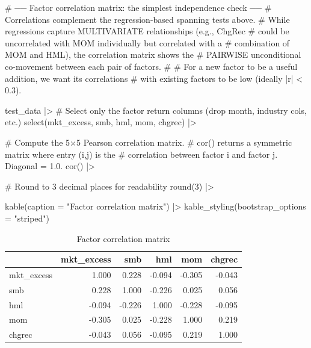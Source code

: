 \documentclass[
  letterpaper,
  DIV=11,
  numbers=noendperiod]{scrartcl}
\newenvironment{Shaded}{\begin{snugshade}}{\end{snugshade}}
\newcommand{\AttributeTok}[1]{\textcolor[rgb]{0.40,0.45,0.13}{#1}}
\newcommand{\CommentTok}[1]{\textcolor[rgb]{0.37,0.37,0.37}{#1}}
\newcommand{\DecValTok}[1]{\textcolor[rgb]{0.68,0.00,0.00}{#1}}
\newcommand{\FunctionTok}[1]{\textcolor[rgb]{0.28,0.35,0.67}{#1}}
\newcommand{\NormalTok}[1]{\textcolor[rgb]{0.00,0.23,0.31}{#1}}
\newcommand{\SpecialCharTok}[1]{\textcolor[rgb]{0.37,0.37,0.37}{#1}}
\newcommand{\StringTok}[1]{\textcolor[rgb]{0.13,0.47,0.30}{#1}}
\begin{document}
\begin{Shaded}
\begin{Highlighting}[]
\CommentTok{\# ── Factor correlation matrix: the simplest independence check ──}
\CommentTok{\# Correlations complement the regression{-}based spanning tests above.}
\CommentTok{\# While regressions capture MULTIVARIATE relationships (e.g., ChgRec}
\CommentTok{\# could be uncorrelated with MOM individually but correlated with a}
\CommentTok{\# combination of MOM and HML), the correlation matrix shows the}
\CommentTok{\# PAIRWISE unconditional co{-}movement between each pair of factors.}
\CommentTok{\#}
\CommentTok{\# For a new factor to be a useful addition, we want its correlations}
\CommentTok{\# with existing factors to be low (ideally |r| \textless{} 0.3).}

\NormalTok{test\_data }\SpecialCharTok{|\textgreater{}}
  \CommentTok{\# Select only the factor return columns (drop month, industry cols, etc.)}
  \FunctionTok{select}\NormalTok{(mkt\_excess, smb, hml, mom, chgrec) }\SpecialCharTok{|\textgreater{}}

  \CommentTok{\# Compute the 5×5 Pearson correlation matrix.}
  \CommentTok{\# cor() returns a symmetric matrix where entry (i,j) is the}
  \CommentTok{\# correlation between factor i and factor j. Diagonal = 1.0.}
  \FunctionTok{cor}\NormalTok{() }\SpecialCharTok{|\textgreater{}}

  \CommentTok{\# Round to 3 decimal places for readability}
  \FunctionTok{round}\NormalTok{(}\DecValTok{3}\NormalTok{) }\SpecialCharTok{|\textgreater{}}

  \FunctionTok{kable}\NormalTok{(}\AttributeTok{caption =} \StringTok{"Factor correlation matrix"}\NormalTok{) }\SpecialCharTok{|\textgreater{}}
  \FunctionTok{kable\_styling}\NormalTok{(}\AttributeTok{bootstrap\_options =} \StringTok{"striped"}\NormalTok{)}
\end{Highlighting}
\end{Shaded}

\begin{longtable}[t]{lrrrrr}
\caption{\label{tab:correlation-matrix}Factor correlation matrix}\\
\toprule
 & mkt\_excess & smb & hml & mom & chgrec\\
\midrule
mkt\_excess & 1.000 & 0.228 & -0.094 & -0.305 & -0.043\\
smb & 0.228 & 1.000 & -0.226 & 0.025 & 0.056\\
hml & -0.094 & -0.226 & 1.000 & -0.228 & -0.095\\
mom & -0.305 & 0.025 & -0.228 & 1.000 & 0.219\\
chgrec & -0.043 & 0.056 & -0.095 & 0.219 & 1.000\\
\bottomrule
\end{longtable}
\end{document}
